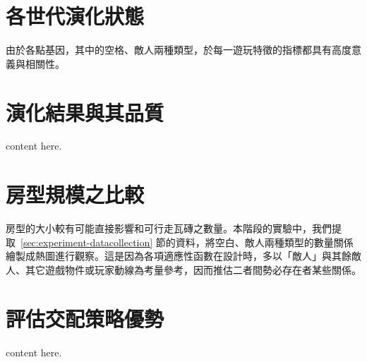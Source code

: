 \section{各世代演化狀態}
\label{sec:experiment-evolutions}

由於各點基因，其中的空格、敵人兩種類型，於每一遊玩特徵的指標都具有高度意義與相關性。

\section{演化結果與其品質}
\label{sec:experiment-xxx}

content here.

\section{房型規模之比較}
\label{sec:experiment-yyy}

房型的大小較有可能直接影響和可行走瓦磚之數量。本階段的實驗中，我們提取~\ref{sec:experiment-datacollection} 節的資料，將空白、敵人兩種類型的數量關係繪製成熱圖進行觀察。這是因為各項適應性函數在設計時，多以「敵人」與其餘敵人、其它遊戲物件或玩家動線為考量參考，因而推估二者間勢必存在者某些關係。

\section{評估交配策略優勢}
\label{sec:experiment-zzzz}

content here.

